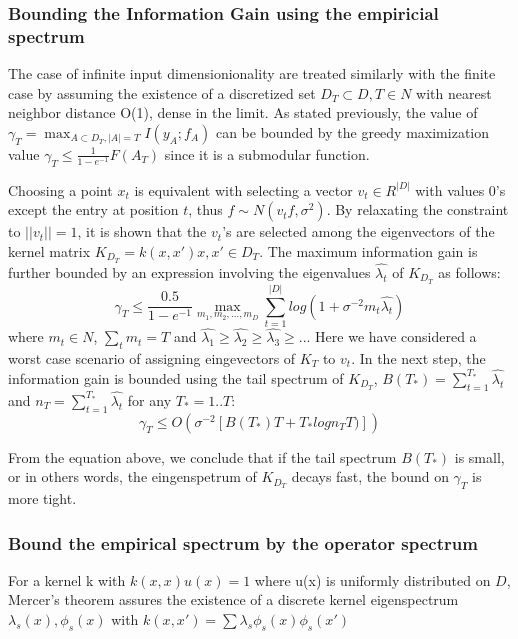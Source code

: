 \documentclass[10pt,journal,a4paper]{IEEEtran}
\begin{document}
\subsubsection{Bounding the Information Gain using the empiricial spectrum}
The case of  infinite input dimensionionality are treated similarly with the finite case by assuming the existence of a discretized set $D_T \subset D, T \in N $ with nearest neighbor distance O(1), dense in the limit. As stated previously, the value of $\gamma_T= \max_{A\subset D_T, |A|=T} I(y_A; f_A)$ can be bounded by the greedy maximization value $ \gamma_T \leq \frac{1}{1-e^{-1}} F(A_T)$ since it is a submodular function. 

Choosing a point $x_t$ is equivalent with selecting a vector $v_t\in R^{|D|}$ with values 0's except the entry at position $t$, thus $f\sim N(v_tf,\sigma^2)$. By relaxating the constraint to $||v_t|| = 1$, it is shown that the $v_t$'s are selected among the eigenvectors of the kernel matrix $K_{D_T} = k(x,x') x,x' \in D_T$. The maximum information gain is further bounded by an expression involving the eigenvalues $\hat{\lambda_t}$ of $K_{D_T}$ as follows:		
\begin{equation}		
	\gamma_T \leq \frac{0.5}{1-e^{-1}} \max_{m_1,m_2,...,m_D} \sum_{t=1}^{|D|} log(1 + \sigma^{-2}m_t \hat{\lambda_t})		
\end{equation}		
where $m_t\in N$, $\sum_t m_t = T$ and $\hat{\lambda_1} \geq \hat{\lambda_2} \geq \hat{\lambda_3} \geq ..$. Here we have considered a worst case scenario of assigning eingevectors of $K_T$ to $v_t$.			
In the next step, the information gain is bounded using the tail spectrum of $K_{D_T}$, $B(T_{*}) = \sum_{t=1}^{T_*}\hat{\lambda_t}$ and $n_T = \sum_{t=1}^{T_*} \hat{\lambda_t}$ for any $T_{*}=1..T$:		
\begin{equation}		
\gamma_{T} \leq O(\sigma^{-2}[B(T_{*})T + T_{*}logn_T T)])		
\end{equation}		
		
From the equation above, we conclude that if the tail spectrum $B(T_{*})$ is small, or in others words, the eingenspetrum of $K_{D_T}$ decays fast, the bound on $\gamma_T$ is more tight.		
\subsubsection{Bound the empirical spectrum by the operator spectrum}		
For a kernel k with $k(x,x)u(x)=1$ where u(x) is uniformly distributed on $D$, Mercer's theorem assures the existence of a discrete kernel eigenspectrum {$\lambda_s(x), \phi_s(x)$}		
with $k(x,x') = \sum \lambda_s\phi_s(x) \phi_s(x')$		
		
\end{document}
